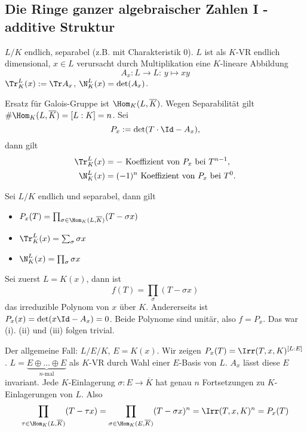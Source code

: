 
\renewcommand{\lecdate}{29.10.14}

\subsection{Die Ringe ganzer algebraischer Zahlen I - additive Struktur}

$L/K$ endlich, separabel (z.B. mit Charakteristik $0$). $L$ ist als $K$-VR endlich dimensional, $x\in L$ verursacht durch Multiplikation eine $K$-lineare Abbildung
\[A_x : L\rightarrow L : \, y\mapsto xy\]
$\Tr_K^L(x):=\Tr A_x$, $\N_K^L(x)=\det(A_x)$.

Ersatz für Galois-Gruppe ist $\Hom_K(L,\overline{K})$. Wegen Separabilität gilt $\#\Hom_K(L,\overline K)=[L:K]=n$. Sei \[P_x:=\det(T\cdot \Id - A_x), \]
dann gilt 
\begin{align*}
\Tr_K^L(x)&=-\text{ Koeffizient von } P_x \text{ bei } T^{n-1},\\
\N_K^L(x)&=(-1)^n \text{ Koeffizient von } P_x \text{ bei } T^0.
\end{align*}

\begin{Fakt} Sei $L/K$ endlich und separabel, dann gilt
 \begin{itemize}
  \item $P_x(T)=\prod_{\sigma\in\Hom_K(L,\overline{K})}(T-\sigma x)$
  \item $\Tr_K^L(x)=\sum_\sigma \sigma x$
  \item $\N_K^L(x)=\prod_\sigma \sigma x$
 \end{itemize}
\end{Fakt}

\begin{Beweis}
 Sei zuerst $L=K(x)$, dann ist \[f(T)=\prod_\sigma (T-\sigma x)\]
 das irreduzible Polynom von $x$ über $K$. Andererseits ist $P_x(x)=\det(x\Id-A_x)=0$.
 Beide Polynome sind unitär, also $f=P_x$. Das war (i). (ii) und (iii) folgen trivial.
 
 Der allgemeine Fall: $L/E/K$, $E=K(x)$. Wir zeigen $P_x(T)=\Irr(T,x,K)^{[L:E]}$.
 $L=\underbrace{E\oplus\ldots \oplus E}_{n\text{-mal}}$ als $K$-VR durch Wahl einer $E$-Basis von $L$. $A_x$ lässt diese $E$ invariant. Jede $K$-Einlagerung $\sigma:E\rightarrow \overline{K}$ hat genau $n$ Fortsetzungen zu $K$-Einlagerungen von $L$. Also
 \[\prod_{\tau\in \Hom_K(L,\overline K)}(T-\tau x)=\prod_{\sigma\in \Hom_K(E,\overline K)} (T-\sigma x)^n =\Irr(T,x,K)^n=P_x(T)\]
\end{Beweis}

